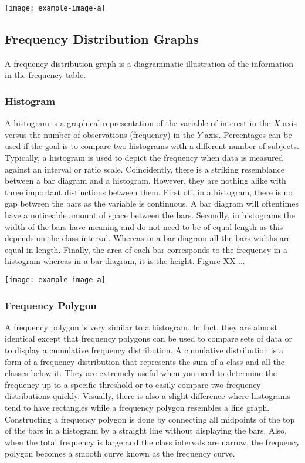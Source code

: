 \texttt{[image: example-image-a]} 

\subsection{Frequency Distribution Graphs}
A frequency distribution graph is a diagrammatic illustration of the information 
in the frequency table. 

\subsubsection{Histogram}
A histogram is a graphical representation of the variable of interest in the 
$X$ axis versus the number of observations (frequency) in the $Y$ axis. Percentages 
can be used if the goal is to compare two histograms with a different number of 
subjects. Typically, a histogram is used to depict the frequency when data is 
measured against an interval or ratio scale. Coincidently, there is a striking
resemblance between a bar diagram and a histogram. However, they are nothing alike 
with three important distinctions between them. First off, in a histogram, there 
is no gap between the bars as the variable is continuous. A bar diagram will 
oftentimes have a noticeable amount of space between the bars.
Secondly, in histograms the width of the bars have meaning and do not need to be 
of equal length as this depends on the class interval. Whereas in a bar diagram all
the bars widths are equal in length. Finally, the area of each bar corresponds 
to the frequency in a histogram whereas in a bar diagram, it is the height. Figure
XX ... 

\texttt{[image: example-image-a]} 

\subsubsection{Frequency Polygon}
A frequency polygon is very similar to a histogram. In fact, they are almost 
identical except that frequency polygons can be used to compare sets of data or 
to display a cumulative frequency distribution. A cumulative distribution is a 
form of a frequency distribution that represents the sum of a class and all the
classes below it. They are extremely useful when you need to determine the frequency 
up to a specific threshold or to easily compare two frequency distributions quickly.
Visually, there is also a slight difference where histograms tend to have rectangles 
while a frequency polygon resembles a line graph. Constructing a frequency polygon 
is done by connecting all midpoints of the top of the bars in a histogram by a 
straight line without displaying the bars. Also, when the total frequency is large 
and the class intervals are narrow, the frequency polygon becomes a smooth curve 
known as the frequency curve. 

